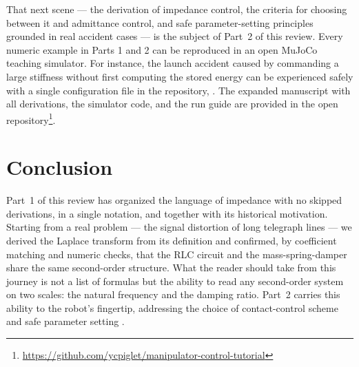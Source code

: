 That next scene --- the derivation of impedance control, the criteria for
choosing between it and admittance control, and safe parameter-setting
principles grounded in real accident cases --- is the subject of Part~2 of
this review.
Every numeric example in Parts 1 and 2 can be reproduced in an open
MuJoCo \cite{todorov2012mujoco} teaching simulator.
For instance, the launch accident caused by commanding a large stiffness
without first computing the stored energy can be experienced safely with a
single configuration file in the repository,
.
The expanded manuscript with all derivations, the simulator code, and the
run guide are provided in the open
repository\footnote{\url{https://github.com/ycpiglet/manipulator-control-tutorial}}.

\section{Conclusion}
\label{sec:u5-conclusion}

Part~1 of this review has organized the language of impedance with no
skipped derivations, in a single notation, and together with its
historical motivation.
Starting from a real problem --- the signal distortion of long telegraph
lines --- we derived the Laplace transform from its definition and
confirmed, by coefficient matching and numeric checks, that the RLC
circuit and the mass-spring-damper share the same second-order structure.
What the reader should take from this journey is not a list of formulas
but the ability to read any second-order system on two scales: the
natural frequency and the damping ratio.
Part~2 carries this ability to the robot's fingertip, addressing the
choice of contact-control scheme and safe parameter setting
\cite{lynchpark2017modernrobotics}.
